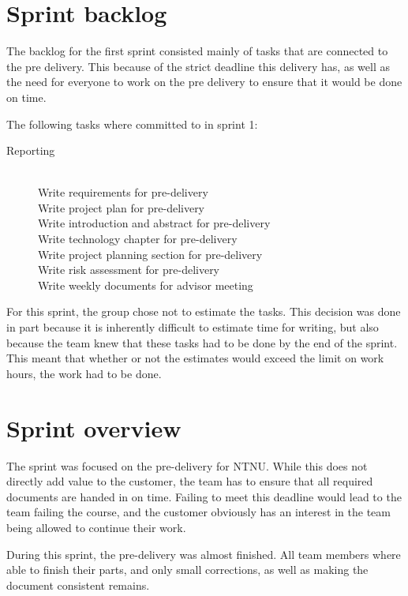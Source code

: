 \documentclass[11pt,a4paper,titlepage,oneside]{report}
\begin{document}
\section{Sprint backlog}
The backlog for the first sprint consisted mainly of tasks that are connected to the pre delivery. This because of the strict deadline this delivery has, as well as the need for everyone to work on the pre delivery to ensure that it would be done on time.

The following tasks where committed to in sprint 1:

\begin{description}
	\item[Reporting] \hfill \\ 
	Write requirements for pre-delivery \hfill \\
	Write project plan for pre-delivery \hfill \\
	Write introduction and abstract for pre-delivery \hfill \\
	Write technology chapter for pre-delivery \hfill \\
	Write project planning section for pre-delivery \hfill \\
	Write risk assessment for pre-delivery \hfill \\
	Write weekly documents for advisor meeting
\end{description}

For this sprint, the group chose not to estimate the tasks. This decision was done in part because it is inherently difficult to estimate time for writing, but also because the team knew that these tasks had to be done by the end of the sprint. This meant that whether or not the estimates would exceed the limit on work hours, the work had to be done.

\section{Sprint overview}
The sprint was focused on the pre-delivery for NTNU. While this does not directly add value to the customer, the team has to ensure that all required documents are handed in on time. Failing to meet this deadline would lead to the team failing the course, and the customer obviously has an interest in the team being allowed to continue their work. 

During this sprint, the pre-delivery was almost finished. All team members where able to finish their parts, and only small corrections, as well as making the document consistent remains. 
\end{document}
